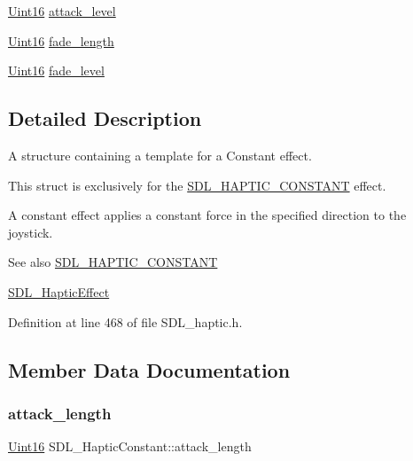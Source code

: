 \begin{DoxyCompactItemize}
\item 
\mbox{\hyperlink{_s_d_l__stdinc_8h_a31fcc0a076c9068668173ee26d33e42b}{Uint16}} \mbox{\hyperlink{struct_s_d_l___haptic_constant_a0928a37f3fab0e5b7daffc7a1d65744c}{attack\+\_\+level}}
\item 
\mbox{\hyperlink{_s_d_l__stdinc_8h_a31fcc0a076c9068668173ee26d33e42b}{Uint16}} \mbox{\hyperlink{struct_s_d_l___haptic_constant_a647a6b761ac6ba16160d0892a12806bc}{fade\+\_\+length}}
\item 
\mbox{\hyperlink{_s_d_l__stdinc_8h_a31fcc0a076c9068668173ee26d33e42b}{Uint16}} \mbox{\hyperlink{struct_s_d_l___haptic_constant_a49f6499c89f3e494efbe92f12277c949}{fade\+\_\+level}}
\end{DoxyCompactItemize}


\subsection{Detailed Description}
A structure containing a template for a Constant effect. 

This struct is exclusively for the \mbox{\hyperlink{_s_d_l__haptic_8h_a955fb9f680dcf9cc72a3d5263e85b80a}{S\+D\+L\+\_\+\+H\+A\+P\+T\+I\+C\+\_\+\+C\+O\+N\+S\+T\+A\+NT}} effect.

A constant effect applies a constant force in the specified direction to the joystick.

\begin{DoxySeeAlso}{See also}
\mbox{\hyperlink{_s_d_l__haptic_8h_a955fb9f680dcf9cc72a3d5263e85b80a}{S\+D\+L\+\_\+\+H\+A\+P\+T\+I\+C\+\_\+\+C\+O\+N\+S\+T\+A\+NT}} 

\mbox{\hyperlink{union_s_d_l___haptic_effect}{S\+D\+L\+\_\+\+Haptic\+Effect}} 
\end{DoxySeeAlso}


Definition at line 468 of file S\+D\+L\+\_\+haptic.\+h.



\subsection{Member Data Documentation}
\mbox{\label{struct_s_d_l___haptic_constant_a907bade68ab53fb24e7d2651d19b767f}} 
\subsubsection{\texorpdfstring{attack\_length}{attack\_length}}
{\footnotesize\ttfamily \mbox{\hyperlink{_s_d_l__stdinc_8h_a31fcc0a076c9068668173ee26d33e42b}{Uint16}} S\+D\+L\+\_\+\+Haptic\+Constant\+::attack\+\_\+length}

